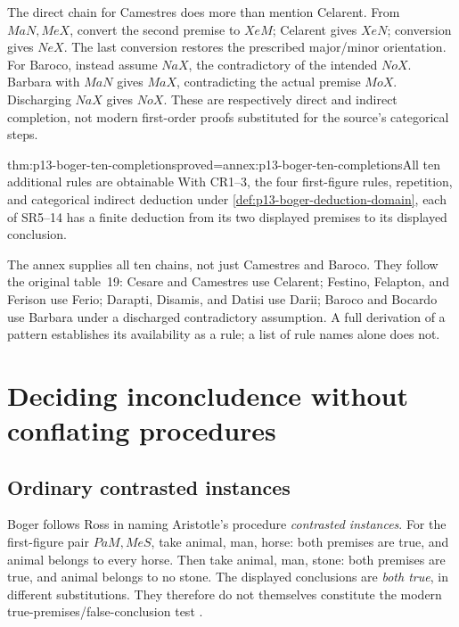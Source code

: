 

The direct chain for Camestres does more than mention Celarent. From
\(MaN,MeX\), convert the second premise to \(XeM\); Celarent gives
\(XeN\); conversion gives \(NeX\). The last conversion restores the prescribed
major/minor orientation. For Baroco, instead assume \(NaX\), the contradictory
of the intended \(NoX\). Barbara with \(MaN\) gives \(MaX\), contradicting
the actual premise \(MoX\). Discharging \(NaX\) gives \(NoX\).
These are respectively direct and indirect completion, not modern
first-order proofs substituted for the source's categorical steps.

\begin{hbtheorem}{thm:p13-boger-ten-completions}{proved=annex:p13-boger-ten-completions}{All ten additional rules are obtainable}
With CR1--3, the four first-figure rules, repetition, and categorical indirect
deduction under \cref{def:p13-boger-deduction-domain}, each of SR5--14 has a
finite deduction from its two displayed premises to its displayed conclusion.
\end{hbtheorem}

The annex supplies all ten chains, not just Camestres and Baroco.
They follow the original table~19: Cesare and Camestres use Celarent;
Festino, Felapton, and Ferison use Ferio; Darapti, Disamis, and Datisi
use Darii; Baroco and Bocardo use Barbara under a discharged contradictory
assumption. A full derivation of a pattern establishes its availability as a
rule; a list of rule names alone does not.

\section{Deciding inconcludence without conflating procedures}
\label{sec:p13-boger-inconcludence}

\subsection{Ordinary contrasted instances}
\label{sec:p13-boger-ordinary-contrast}

Boger follows Ross in naming Aristotle's procedure \emph{contrasted instances}.
For the first-figure pair \(PaM,MeS\), take animal, man, horse: both premises
are true, and animal belongs to every horse. Then take animal, man, stone:
both premises are true, and animal belongs to no stone. The displayed
conclusions are \emph{both true}, in different substitutions. They therefore
do not themselves constitute the modern true-premises/false-conclusion test
\parencite[pp.~188--192]{Boger2004UnderlyingLogic}.

